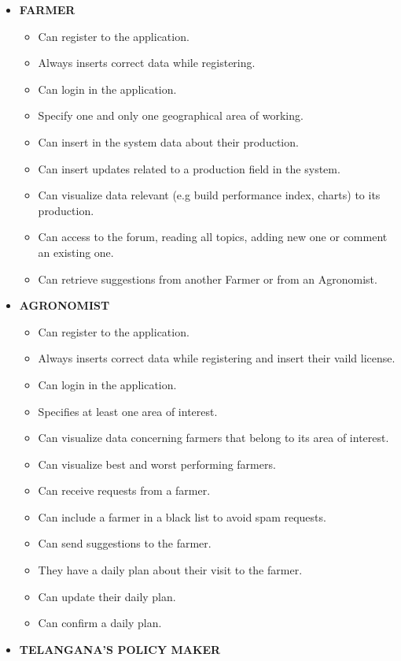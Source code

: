 	\begin{itemize}
		\item \textbf{FARMER}
			\begin{itemize}
				\item Can register to the application.
				\item Always inserts correct data while registering.
				\item Can login in the application.
				\item Specify one and only one geographical area of working.
				\item Can insert in the system data about their production.
				\item Can insert updates related to a production field in the system.
				\item Can visualize data relevant (e.g build performance index, charts) to its production.
				\item Can access to the forum, reading all topics, adding new one or comment an existing one.
				\item Can retrieve suggestions from another Farmer or from an Agronomist.
			\end{itemize}
		\item \textbf{AGRONOMIST}
			\begin{itemize}
				\item Can register to the application.
				\item Always inserts correct data while registering and insert their vaild license.
				\item Can login in the application.
				\item Specifies at least one area of interest.
				\item Can visualize data concerning farmers that belong to its area of interest.
				\item Can visualize best and worst performing farmers.
				\item Can receive requests from a farmer. 
				\item Can include a farmer in a black list to avoid spam requests.
				\item Can send suggestions to the farmer.
				\item They have a daily plan about their visit to the farmer.
				\item Can update their daily plan.
				\item Can confirm a daily plan.
			\end{itemize}
		\item \textbf{TELANGANA'S POLICY MAKER}

\end{itemize}
